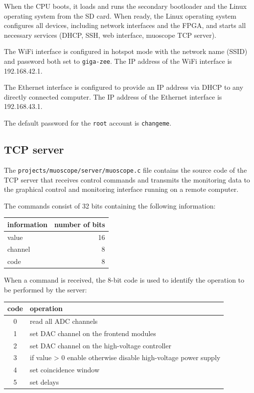 \documentclass[12pt, a4paper]{article}
\begin{document}
When the CPU boots, it loads and runs the secondary bootloader and the Linux operating system from the SD card. When ready, the Linux operating system configures all devices, including network interfaces and the FPGA, and starts all necessary services (DHCP, SSH, web interface, muoscope TCP server).

The WiFi interface is configured in hotspot mode with the network name (SSID) and password both set to \texttt{giga-zee}. The IP address of the WiFi interface is 192.168.42.1.

The Ethernet interface is configured to provide an IP address via DHCP to any directly connected computer. The IP address of the Ethernet interface is 192.168.43.1.

The default password for the \texttt{root} account is \texttt{changeme}.

\subsection{TCP server}

The \texttt{projects/muoscope/server/muoscope.c} file contains the source code of the TCP server that receives control commands and transmits the monitoring data to the graphical control and monitoring interface running on a remote computer.

The commands consist of 32 bits containing the following information:
\begin{center}
  \begin{tabular}{|l|r|}
  \hline
  \textbf{information} & \textbf{number of bits} \\
  \hline
  value & 16 \\
  \hline
  channel & 8 \\
  \hline
  code & 8 \\
  \hline
  \end{tabular}
\end{center}

When a command is received, the 8-bit code is used to identify the operation to be performed by the server:
\begin{center}
  \begin{tabular}{|c|l|}
  \hline
  \textbf{code} & \textbf{operation} \\
  \hline
  0 & read all ADC channels \\
  \hline
  1 & set DAC channel on the frontend modules \\
  \hline
  2 & set DAC channel on the high-voltage controller \\
  \hline
  3 & if value > 0 enable otherwise disable high-voltage power supply \\
  \hline
  4 & set coincidence window \\
  \hline
  5 & set delays \\
  \hline
  \end{tabular}
\end{center}
\end{document}
